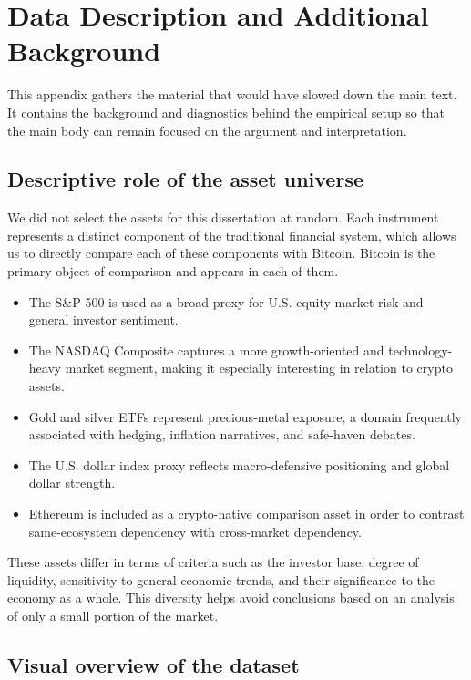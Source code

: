 \section{Data Description and Additional Background}

This appendix gathers the material that would have slowed down the main text. It contains the background and diagnostics behind the empirical setup so that the main body can remain focused on the argument and interpretation.

\subsection{Descriptive role of the asset universe}

We did not select the assets for this dissertation at random. Each instrument represents a distinct component of the traditional financial system, which allows us to directly compare each of these components with Bitcoin. Bitcoin is the primary object of comparison and appears in each of them.

\begin{itemize}
    \item The S\&P 500 is used as a broad proxy for U.S. equity-market risk and general investor sentiment.
    \item The NASDAQ Composite captures a more growth-oriented and technology-heavy market segment, making it especially interesting in relation to crypto assets.
    \item Gold and silver ETFs represent precious-metal exposure, a domain frequently associated with hedging, inflation narratives, and safe-haven debates.
    \item The U.S. dollar index proxy reflects macro-defensive positioning and global dollar strength.
    \item Ethereum is included as a crypto-native comparison asset in order to contrast same-ecosystem dependency with cross-market dependency.
\end{itemize}

These assets differ in terms of criteria such as the investor base, degree of liquidity, sensitivity to general economic trends, and their significance to the economy as a whole. This diversity helps avoid conclusions based on an analysis of only a small portion of the market.

\subsection{Visual overview of the dataset}

